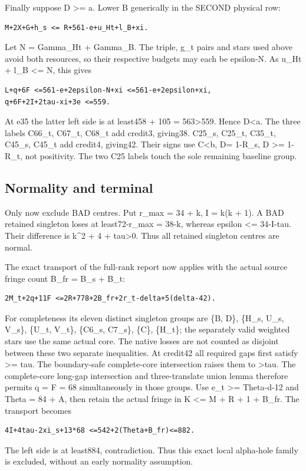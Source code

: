 \documentclass[11pt,a4paper]{article}
\begin{document}
Finally suppose D \textgreater= a. Lower B generically in the SECOND
physical row:

\begin{verbatim}
M+2X+G+h_s <= R+561-e+u_Ht+l_B+xi.
\end{verbatim}

Let N = Gamma\_Ht + Gamma\_B. The triple, g\_t pairs and stars used
above avoid both resources, so their respective budgets may each be
epsilon-N. As u\_Ht + l\_B \textless= N, this gives

\begin{verbatim}
L+q+6F <=561-e+2epsilon-N+xi <=561-e+2epsilon+xi,
q+6F+2I+2tau-xi+3e <=559.
\end{verbatim}

At e35 the latter left side is at least458 + 105 = 563\textgreater559.
Hence D\textless a. The three labels C66\_t, C67\_t, C68\_t add credit3,
giving38. C25\_s, C25\_t, C35\_t, C45\_s, C45\_t add credit4, giving42.
Their signs use C\textless b, D= 1-R\_s, D \textgreater= 1-R\_t, not
positivity. The two C25 labels touch the sole remaining baseline group.

\hypertarget{normality-and-terminal}{%
\subsection{Normality and terminal}\label{normality-and-terminal}}

Only now exclude BAD centres. Put r\_max = 34 + k, I = k(k + 1). A BAD
retained singleton loses at least72-r\_max = 38-k, whereas epsilon
\textless= 34-I-tau. Their difference is k\^{}2 + 4 + tau\textgreater0.
Thus all retained singleton centres are normal.

The exact transport of the full-rank report now applies with the actual
source fringe count B\_fr = B\_s + B\_t:

\begin{verbatim}
2M_t+2q+11F <=2R+778+2B_fr+2r_t-delta+5(delta-42).
\end{verbatim}

For completeness its eleven distinct singleton groups are \{B, D\},
\{H\_s, U\_s, V\_s\}, \{U\_t, V\_t\}, \{C6\_s, C7\_s\}, \{C\}, \{H\_t\};
the separately valid weighted stars use the same actual core. The native
losses are not counted as disjoint between these two separate
inequalities. At credit42 all required gaps first satisfy \textgreater=
tau. The boundary-safe complete-core intersection raises them to
\textgreater tau. The complete-core long-gap intersection and
three-translate union lemma therefore permits q = F = 68 simultaneously
in those groups. Use e\_t \textgreater= Theta-d-12 and Theta = 84 + A,
then retain the actual fringe in K \textless= M + R + 1 + B\_fr. The
transport becomes

\begin{verbatim}
4I+4tau-2xi_s+13*68 <=542+2(Theta+B_fr)<=882.
\end{verbatim}

The left side is at least884, contradiction. Thus this exact local
alpha-hole family is excluded, without an early normality assumption.
\end{document}
